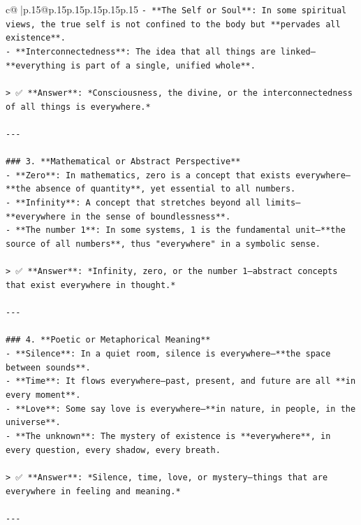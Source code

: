 \documentclass{article}
\begin{document}
{\begin{supertabular}{c@{$\;$}|p{.15\linewidth}@{}p{.15\linewidth}p{.15\linewidth}p{.15\linewidth}p{.15\linewidth}p{.15\linewidth}}
{{{\texttt{{-} **The Self or Soul**: In some spiritual views, the true self is not confined to the body but **pervades all existence**.} \\
\texttt{{-} **Interconnectedness**: The idea that all things are linked—**everything is part of a single, unified whole**.} \\
\\ 
\texttt{> ✅ **Answer**: *Consciousness, the divine, or the interconnectedness of all things is everywhere.*} \\
\\ 
\texttt{{-}{-}{-}} \\
\\ 
\texttt{\#\#\# 3. **Mathematical or Abstract Perspective**} \\
\texttt{{-} **Zero**: In mathematics, zero is a concept that exists everywhere—**the absence of quantity**, yet essential to all numbers.} \\
\texttt{{-} **Infinity**: A concept that stretches beyond all limits—**everywhere in the sense of boundlessness**.} \\
\texttt{{-} **The number 1**: In some systems, 1 is the fundamental unit—**the source of all numbers**, thus "everywhere" in a symbolic sense.} \\
\\ 
\texttt{> ✅ **Answer**: *Infinity, zero, or the number 1—abstract concepts that exist everywhere in thought.*} \\
\\ 
\texttt{{-}{-}{-}} \\
\\ 
\texttt{\#\#\# 4. **Poetic or Metaphorical Meaning**} \\
\texttt{{-} **Silence**: In a quiet room, silence is everywhere—**the space between sounds**.} \\
\texttt{{-} **Time**: It flows everywhere—past, present, and future are all **in every moment**.} \\
\texttt{{-} **Love**: Some say love is everywhere—**in nature, in people, in the universe**.} \\
\texttt{{-} **The unknown**: The mystery of existence is **everywhere**, in every question, every shadow, every breath.} \\
\\ 
\texttt{> ✅ **Answer**: *Silence, time, love, or mystery—things that are everywhere in feeling and meaning.*} \\
\\ 
\texttt{{-}{-}{-}} \\
}}}
\end{supertabular}}
\end{document}
